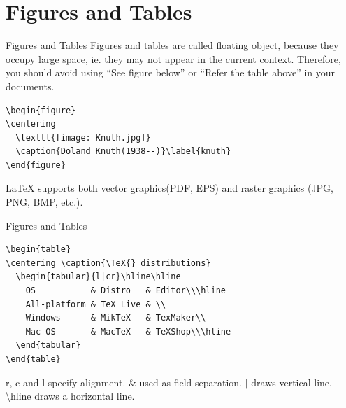 \documentclass[10pt]{beamer}
\begin{document}
\section{Figures and Tables}
\begin{frame}[fragile]{Figures and Tables}
    Figures and tables are called floating object, because they occupy
    large space, ie. they may not appear in the current context.
    Therefore, you should avoid using ``See figure below'' or
    ``Refer the table above'' in your documents.

\begin{verbatim}
\begin{figure}
\centering
  \texttt{[image: Knuth.jpg]}
  \caption{Doland Knuth(1938--)}\label{knuth}
\end{figure}
\end{verbatim}

    \LaTeX{} supports both vector graphics(PDF, EPS) and raster graphics
    (JPG, PNG, BMP, etc.).

\end{frame}

\begin{frame}[fragile]{Figures and Tables}
\begin{verbatim}
\begin{table}
\centering \caption{\TeX{} distributions}
  \begin{tabular}{l|cr}\hline\hline
    OS           & Distro   & Editor\\\hline
    All-platform & TeX Live & \\
    Windows      & MikTeX   & TexMaker\\
    Mac OS       & MacTeX   & TeXShop\\\hline
  \end{tabular}
\end{table}
\end{verbatim}
    \alert{r}, \alert{c} and \alert{l} specify alignment.
    \alert{\&} used as field separation. \alert{$|$} draws vertical
    line, \alert{\textbackslash hline} draws a horizontal line.
\end{frame}
\end{document}
